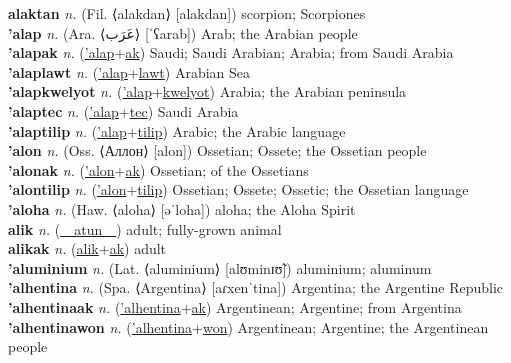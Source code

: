 \textbf{alaktan} \textit{n.} (Fil. ⟨alakdan⟩ [alakdan])
scorpion; Scorpiones \label{alaktan} \\
\textbf{'alap} \textit{n.} (Ara. ⟨عَرَب⟩ [ˈʕarab])
Arab; the Arabian people \label{'alap} \\
\textbf{'alapak} \textit{n.} (\hyperref['alap]{'alap}+\hyperref[ak]{ak})
Saudi; Saudi Arabian; Arabia; from Saudi Arabia \label{'alapak} \\
\textbf{'alaplawt} \textit{n.} (\hyperref['alap]{'alap}+\hyperref[lawt]{lawt})
Arabian Sea \label{'alaplawt} \\
\textbf{'alapkwelyot} \textit{n.} (\hyperref['alap]{'alap}+\hyperref[kwelyot]{kwelyot})
Arabia; the Arabian peninsula \label{'alapkwelyot} \\
\textbf{'alaptec} \textit{n.} (\hyperref['alap]{'alap}+\hyperref[tec]{tec})
Saudi Arabia \label{'alaptec} \\
\textbf{'alaptilip} \textit{n.} (\hyperref['alap]{'alap}+\hyperref[tilip]{tilip})
Arabic; the Arabic language \label{'alaptilip} \\
\textbf{'alon} \textit{n.} (Oss. ⟨Аллон⟩ [alon])
Ossetian; Ossete; the Ossetian people \label{'alon} \\
\textbf{'alonak} \textit{n.} (\hyperref['alon]{'alon}+\hyperref[ak]{ak})
Ossetian; of the Ossetians \label{'alonak} \\
\textbf{'alontilip} \textit{n.} (\hyperref['alon]{'alon}+\hyperref[tilip]{tilip})
Ossetian; Ossete; Ossetic; the Ossetian language \label{'alontilip} \\
\textbf{'aloha} \textit{n.} (Haw. ⟨aloha⟩ [əˈloha])
aloha; the Aloha Spirit \label{'aloha} \\
\textbf{alik} \textit{n.} (\hyperref[atun]{~~atun~~})
adult; fully-grown animal \label{alik} \\
\textbf{alikak} \textit{n.} (\hyperref[alik]{alik}+\hyperref[ak]{ak})
adult \label{alikak} \\
\textbf{'aluminium} \textit{n.} (Lat. ⟨aluminium⟩ [alʊminɪʊ̃])
aluminium; aluminum \label{'aluminium} \\
\textbf{'alhentina} \textit{n.} (Spa. ⟨Argentina⟩ [aɾxenˈtina])
Argentina; the Argentine Republic \label{'alhentina} \\
\textbf{'alhentinaak} \textit{n.} (\hyperref['alhentina]{'alhentina}+\hyperref[ak]{ak})
Argentinean; Argentine; from Argentina \label{'alhentinaak} \\
\textbf{'alhentinawon} \textit{n.} (\hyperref['alhentina]{'alhentina}+\hyperref[won]{won})
Argentinean; Argentine; the Argentinean people \label{'alhentinawon} \\
